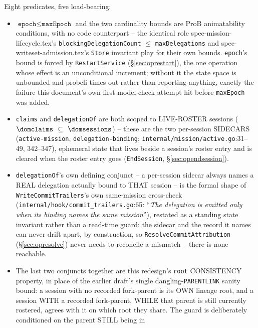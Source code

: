 \documentclass[a4paper,10pt,fleqn]{article}
\newcommand{\fpath}[1]{\texttt{#1}}
\newcommand{\field}[1]{\texttt{#1}}
\begin{document}
Eight predicates, five load-bearing:

\begin{itemize}
  \item $\field{epoch} \leq \field{maxEpoch}$ and the two cardinality bounds are
    ProB animatability conditions, with no code counterpart -- the
    identical role spec-mission-lifecycle.tex's
    \field{blockingDelegationCount} $\leq$ \field{maxDelegations} and
    spec-writeset-admission.tex's \field{Store} invariant play for
    their own bounds. \field{epoch}'s bound is forced by
    \field{RestartService} (\S\ref{sec:oprestart}), the one operation
    whose effect is an unconditional increment; without it the state
    space is unbounded and probcli times out rather than reporting
    anything, exactly the failure this document's own first model-check
    attempt hit before \field{maxEpoch} was added.
  \item \field{claims} and \field{delegationOf} are both scoped to
    LIVE-ROSTER sessions ($\dom \field{claims}$ $\subseteq$
    $\dom \field{sessions}$) -- these are the two per-session SIDECARS
    (\field{active-mission}, \field{delegation-binding};
    \fpath{internal/mission/active.go}:31--49, 342--347), ephemeral
    state that lives beside a session's roster entry and is cleared
    when the roster entry goes (\field{EndSession},
    \S\ref{sec:opendsession}).
  \item \field{delegationOf}'s own defining conjunct -- a per-session
    sidecar always names a REAL delegation actually bound to THAT
    session -- is the formal shape of
    \field{WriteCommitTrailers}'s own same-mission cross-check
    (\fpath{internal/hook/commit\_trailers.go}:65: ``\emph{The
    delegation is emitted only when its binding names the same
    mission}''), restated as a standing state invariant rather than a
    read-time guard: the sidecar and the record it names can never
    drift apart, by construction, so \field{ResolveCommitAttribution}
    (\S\ref{sec:opresolve}) never needs to reconcile a mismatch -- there
    is none reachable.
  \item The last two conjuncts together are this redesign's
    \field{root} CONSISTENCY property, in place of the earlier draft's
    single dangling-\field{PARENTLINK} sanity bound: a session with no
    recorded fork-parent is its OWN lineage root, and a session WITH a
    recorded fork-parent, WHILE that parent is still currently
    rostered, agrees with it on which root they share. The guard is
    deliberately conditioned on the parent STILL being in

\end{itemize}
\end{document}

